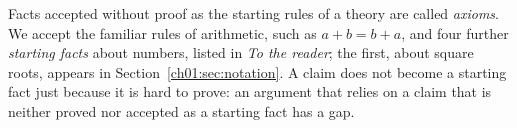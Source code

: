 Facts accepted without proof as the starting rules of a theory are called \emph{axioms}. We accept the familiar rules of arithmetic, such as $a+b=b+a$, and four further \emph{starting facts} about numbers, listed in \emph{To the reader}; the first, about square roots, appears in Section~\ref{ch01:sec:notation}. A claim does not become a starting fact just because it is hard to prove: an argument that relies on a claim that is neither proved nor accepted as a starting fact has a gap.

